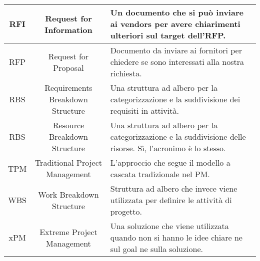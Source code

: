 \begin{tabularx}{\textwidth}{|c|c|X|}
	\hline
	RFI & Request for Information & Un documento che si può inviare ai vendors per avere chiarimenti ulteriori sul target dell'RFP. \\
	\hline
	RFP & Request for Proposal & Documento da inviare ai fornitori per chiedere se sono interessati alla nostra richiesta. \\
	\hline
	RBS & Requirements Breakdown Structure & Una struttura ad albero per la categorizzazione e la suddivisione dei requisiti in attività. \\
	\hline
	RBS & Resource Breakdown Structure & Una struttura ad albero per la categorizzazione e la suddivisione delle risorse. Sì, l'acronimo è lo stesso. \\
	\hline
	TPM & Traditional Project Management & L'approccio che segue il modello a cascata tradizionale nel PM. \\
	\hline
	WBS & Work Breakdown Structure & Struttura ad albero che invece viene utilizzata per definire le attività di progetto.\\
	\hline
	xPM & Extreme Project Management &  Una soluzione che viene utilizzata quando non si hanno le idee chiare ne sul goal ne sulla soluzione.\\
	\hline
\end{tabularx}
